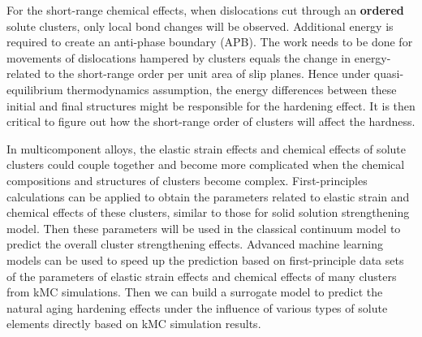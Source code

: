 For the short-range chemical effects, when dislocations cut through an \textbf{ordered} solute clusters, only local bond changes will be observed. Additional energy is required to create an anti-phase boundary (APB). The work needs to be done for movements of dislocations hampered by clusters equals the change in energy-related to the short-range order per unit area of slip planes. Hence under quasi-equilibrium thermodynamics assumption, the energy differences between these initial and final structures might be responsible for the hardening effect. It is then critical to figure out how the short-range order of clusters will affect the hardness.

In multicomponent alloys, the elastic strain effects and chemical effects of solute clusters could couple together and become more complicated when the chemical compositions and structures of clusters become complex. First-principles calculations can be applied to obtain the parameters related to elastic strain and chemical effects of these clusters, similar to those for solid solution strengthening model\cite{yasi2010first}.  Then these parameters will be used in the classical continuum model to predict the overall cluster strengthening effects. Advanced machine learning models can be used to speed up the prediction based on first-principle data sets of the parameters of elastic strain effects and chemical effects of many clusters from \ac{kMC} simulations. Then we can build a surrogate model to predict the natural aging hardening effects under the influence of various types of solute elements directly based on \ac{kMC} simulation results.

